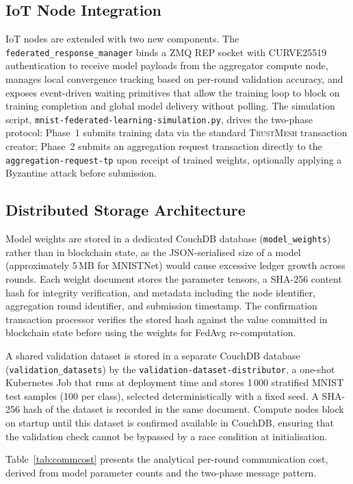 \documentclass[lettersize,journal]{IEEEtran}
\newcommand{\tm}{\textsc{TrustMesh}}
\begin{document}
\subsection{IoT Node Integration}

IoT nodes are extended with two new components. The
\texttt{federated\_response\_manager} binds a ZMQ REP socket with CURVE25519
authentication to receive model payloads from the aggregator compute node, manages local
convergence tracking based on per-round validation accuracy, and exposes event-driven
waiting primitives that allow the training loop to block on training completion and global
model delivery without polling. The simulation script,
\texttt{mnist-federated-learning-simulation.py}, drives the two-phase protocol: Phase~1
submits training data via the standard \tm{} transaction creator; Phase~2 submits an
aggregation request transaction directly to the \texttt{aggregation-request-tp} upon
receipt of trained weights, optionally applying a Byzantine attack before submission.

\subsection{Distributed Storage Architecture}

Model weights are stored in a dedicated CouchDB database (\texttt{model\_weights}) rather
than in blockchain state, as the JSON-serialised size of a model (approximately 5\,MB for
MNISTNet) would cause excessive ledger growth across rounds. Each weight document stores the
parameter tensors, a SHA-256 content hash for integrity verification, and metadata
including the node identifier, aggregation round identifier, and submission timestamp.
The confirmation transaction processor verifies the stored hash against the value committed
in blockchain state before using the weights for FedAvg re-computation.

A shared validation dataset is stored in a separate CouchDB database
(\texttt{validation\_datasets}) by the \texttt{validation-dataset-distributor}, a
one-shot Kubernetes Job that runs at deployment time and stores 1\,000 stratified MNIST
test samples (100 per class), selected deterministically with a fixed seed. A SHA-256 hash
of the dataset is recorded in the same document. Compute nodes block on startup until this
dataset is confirmed available in CouchDB, ensuring that the validation check cannot be
bypassed by a race condition at initialisation.

Table~\ref{tab:commcost} presents the analytical per-round communication cost, derived
from model parameter counts and the two-phase message pattern.
\end{document}
